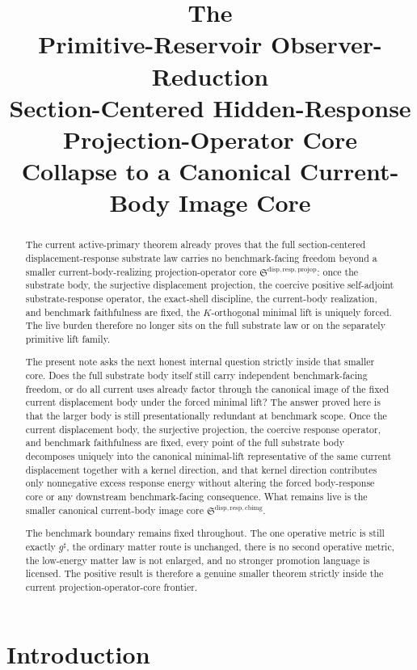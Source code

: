 \documentclass[11pt]{article}
\title{\textbf{The \TheoryName{}}\\[0.4em]
\large Primitive-Reservoir Observer-Reduction\\
\large Section-Centered Hidden-Response\\
\large Projection-Operator Core\\
\large Collapse to a Canonical Current-Body Image Core}
\author{}
\date{}
\newcommand{\CompletedMetric}{g^{\sharp}}
\newcommand{\ProjectionOperatorCore}{\mathfrak S^{\mathrm{disp,resp,projop}}}
\newcommand{\CurrentBodyImageCore}{\mathfrak S^{\mathrm{disp,resp,cbimg}}}
\begin{document}
\maketitle

\begin{abstract}
The current active-primary theorem already proves that the full section-centered displacement-response substrate law carries no benchmark-facing freedom beyond a smaller current-body-realizing projection-operator core \(\ProjectionOperatorCore\): once the substrate body, the surjective displacement projection, the coercive positive self-adjoint substrate-response operator, the exact-shell discipline, the current-body realization, and benchmark faithfulness are fixed, the \(K\)-orthogonal minimal lift is uniquely forced. The live burden therefore no longer sits on the full substrate law or on the separately primitive lift family.

The present note asks the next honest internal question strictly inside that smaller core. Does the full substrate body itself still carry independent benchmark-facing freedom, or do all current uses already factor through the canonical image of the fixed current displacement body under the forced minimal lift? The answer proved here is that the larger body is still presentationally redundant at benchmark scope. Once the current displacement body, the surjective projection, the coercive response operator, and benchmark faithfulness are fixed, every point of the full substrate body decomposes uniquely into the canonical minimal-lift representative of the same current displacement together with a kernel direction, and that kernel direction contributes only nonnegative excess response energy without altering the forced body-response core or any downstream benchmark-facing consequence. What remains live is the smaller canonical current-body image core \(\CurrentBodyImageCore\).

The benchmark boundary remains fixed throughout. The one operative metric is still exactly \(\CompletedMetric\), the ordinary matter route is unchanged, there is no second operative metric, the low-energy matter law is not enlarged, and no stronger promotion language is licensed. The positive result is therefore a genuine smaller theorem strictly inside the current projection-operator-core frontier.
\end{abstract}

\section{Introduction}
\end{document}
